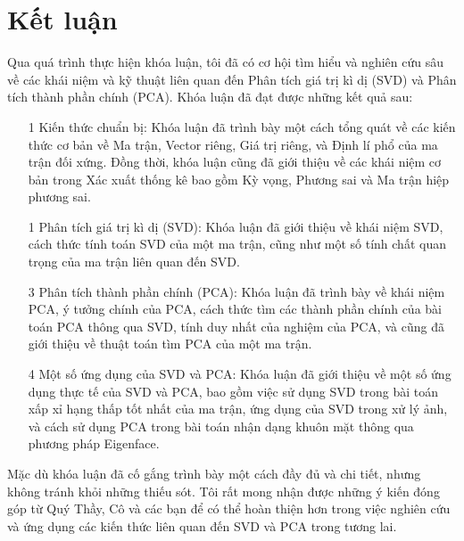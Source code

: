 \documentclass[12pt,a4paper,oneside]{report}
\numberwithin{equation}{section}
\begin{document}
\chapter{Kết luận}
Qua quá trình thực hiện khóa luận, tôi đã có cơ hội tìm hiểu và nghiên cứu sâu về các khái niệm và kỹ thuật liên quan đến Phân tích giá trị kì dị (SVD) và Phân tích thành phần chính (PCA). Khóa luận đã đạt được những kết quả sau:
\begin{itemize}
	\item[1]Kiến thức chuẩn bị: Khóa luận đã trình bày một cách tổng quát về các kiến thức cơ bản về Ma trận, Vector riêng, Giá trị riêng, và Định lí phổ của ma trận đối xứng. Đồng thời, khóa luận cũng đã giới thiệu về các khái niệm cơ bản trong Xác xuất thống kê bao gồm Kỳ vọng, Phương sai và Ma trận hiệp phương sai.

\item[1]Phân tích giá trị kì dị (SVD): Khóa luận đã giới thiệu về khái niệm SVD, cách thức tính toán SVD của một ma trận, cũng như một số tính chất quan trọng của ma trận liên quan đến SVD.

\item[3]Phân tích thành phần chính (PCA): Khóa luận đã trình bày về khái niệm PCA, ý tưởng chính của PCA, cách thức tìm các thành phần chính của bài toán PCA thông qua SVD, tính duy nhất của nghiệm của PCA, và cũng đã giới thiệu về thuật toán tìm PCA của một ma trận.

\item[4]Một số ứng dụng của SVD và PCA: Khóa luận đã giới thiệu về một số ứng dụng thực tế của SVD và PCA, bao gồm việc sử dụng SVD trong bài toán xấp xỉ hạng thấp tốt nhất của ma trận, ứng dụng của SVD trong xử lý ảnh, và cách sử dụng PCA trong bài toán nhận dạng khuôn mặt thông qua phương pháp Eigenface.
\end{itemize}
Mặc dù khóa luận đã cố gắng trình bày một cách đầy đủ và chi tiết, nhưng không tránh khỏi những thiếu sót. Tôi rất mong nhận được những ý kiến đóng góp từ Quý Thầy, Cô và các bạn để có thể hoàn thiện hơn trong việc nghiên cứu và ứng dụng các kiến thức liên quan đến SVD và PCA trong tương lai.
\end{document}
